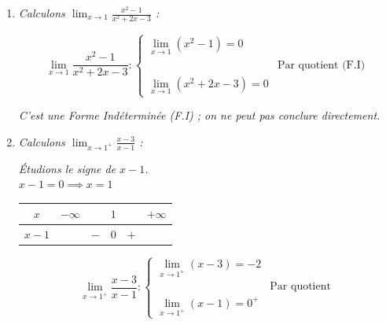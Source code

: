 \documentclass[12pt,a4paper]{article}
\begin{document}
\begin{enumerate}
    \item \textit{Calculons $\displaystyle \lim_{x \to 1} \frac{x^2 - 1}{x^2 + 2x - 3}$ :}
    
    \vspace{0.2cm}
    
    \[
    \lim_{x \to 1} \frac{x^2 - 1}{x^2 + 2x - 3} :
    \begin{cases}
    \displaystyle \lim_{x \to 1} (x^2 - 1) = 0 \\
    & \text{Par quotient (F.I)} \\
    \displaystyle \lim_{x \to 1} (x^2 + 2x - 3) = 0
    \end{cases}
    \]
    
    \vspace{0.2cm}
    \textit{C'est une Forme Indéterminée (F.I) ; on ne peut pas conclure directement.}

    \vspace{0.4cm}

    \item \textit{Calculons $\displaystyle \lim_{x \to 1^+} \frac{x - 3}{x - 1}$ :}
    
    \vspace{0.2cm}
    
    \textit{Étudions le signe de $x - 1$.} \\
    $x - 1 = 0 \implies x = 1$
    
    \vspace{0.2cm}
    
    \begin{center}
    \begin{tabular}{|c|ccccc|}
        \hline
        $x$ & $-\infty$ & & $1$ & & $+\infty$ \\
        \hline
        $x - 1$ & & $-$ & $0$ & $+$ & \\
        \hline
    \end{tabular}
    \end{center}
    
    \vspace{0.2cm}
    
    \[
    \lim_{x \to 1^+} \frac{x - 3}{x - 1} :
    \begin{cases}
    \displaystyle \lim_{x \to 1^+} (x - 3) = -2 \\
    & \text{Par quotient} \\
    \displaystyle \lim_{x \to 1^+} (x - 1) = 0^+
    \end{cases}
    \]
    

\end{enumerate}
\end{document}
